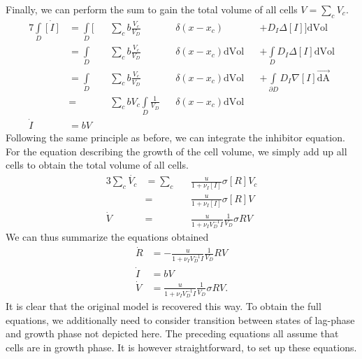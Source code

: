 \documentclass[10pt,twocolumn,5p]{elsarticle}
\numberwithin{equation}{section}
\begin{document}
Finally, we can perform the sum to gain the total volume of all cells $V=\sum\limits_c V_c$.
\begin{alignat}{7}
    \int\limits_D\dot{[I]} &= \int\limits_D \bigg[&&\sum\limits_c b\frac{V_c}{V_D}&&\delta(x-x_c) &&+ D_I\Delta [I]\bigg]\text{dVol}\\
    &= \int\limits_D&&\sum\limits_c b\frac{V_c}{V_D}&&\delta(x-x_c) \text{dVol} &&+ \int\limits_D D_I\Delta [I]\text{dVol}\\
    &= \int\limits_D&&\sum\limits_c b\frac{V_c}{V_D}&&\delta(x-x_c) \text{dVol} &&+ \int\limits_{\partial D} D_I\nabla [I]\vec{\text{dA}}\\
    &= &&\sum\limits_c b V_c\int\limits_D \frac{1}{V_D} &&\delta(x-x_c) \text{dVol}\\
    \dot{I} &= b V
\end{alignat}
Following the same principle as before, we can integrate the inhibitor equation.
For the equation describing the growth of the cell volume, we simply add up all cells to obtain the total volume of all cells.
\begin{alignat}{3}
    \sum\limits_c\dot{V_c}
    &= \sum\limits_c&&\frac{u}{1+\nu_I [I]} \sigma [R]V_c\\
    &= &&\frac{u}{1+\nu_I [I]} \sigma [R]V\\
    \dot{V} &= &&\frac{u}{1+\nu_I V_D^{-1} I} \frac{1}{V_D}\sigma R V
\end{alignat}
We can thus summarize the equations obtained
\begin{align}
    \dot{R} &= -\frac{u}{1+\nu_I V_D^{-1}I} \frac{1}{V_D} R V\\
    \dot{I} &= b V\\
    \dot{V} &= \frac{u}{1+\nu_I V_D^{-1} I} \frac{1}{V_D}\sigma R V.
\end{align}
It is clear that the original model is recovered this way.
To obtain the full equations, we additionally need to consider transition between states of lag-phase and growth phase not depicted here.
The preceding equations all assume that cells are in growth phase.
It is however straightforward, to set up these equations.
%
%
\end{document}
